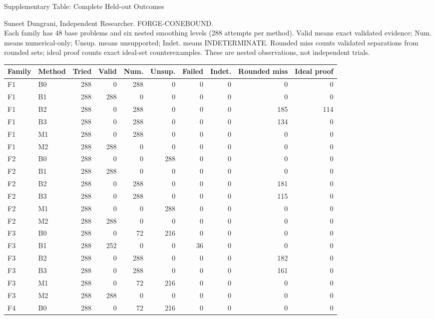 \documentclass[10pt]{article}
\begin{document}
\begin{center}\large Supplementary Table: Complete Held-out Outcomes\end{center}
\noindent Suneet Dungrani, Independent Researcher. FORGE-CONEBOUND.\\
Each family has 48 base problems and six nested smoothing levels (288 attempts per method).
Valid means exact validated evidence; Num. means numerical-only; Unsup. means unsupported;
Indet. means INDETERMINATE. Rounded miss counts validated separations from rounded sets;
ideal proof counts exact ideal-set counterexamples. These are nested observations, not independent trials.
\begin{center}\small
\begin{longtable}{llrrrrrrrr}
\toprule Family & Method & Tried & Valid & Num. & Unsup. & Failed & Indet. & Rounded miss & Ideal proof\\\midrule
F1 & B0 & 288 & 0 & 288 & 0 & 0 & 0 & 0 & 0 \\
F1 & B1 & 288 & 288 & 0 & 0 & 0 & 0 & 0 & 0 \\
F1 & B2 & 288 & 0 & 288 & 0 & 0 & 0 & 185 & 114 \\
F1 & B3 & 288 & 0 & 288 & 0 & 0 & 0 & 134 & 0 \\
F1 & M1 & 288 & 0 & 288 & 0 & 0 & 0 & 0 & 0 \\
F1 & M2 & 288 & 288 & 0 & 0 & 0 & 0 & 0 & 0 \\
F2 & B0 & 288 & 0 & 0 & 288 & 0 & 0 & 0 & 0 \\
F2 & B1 & 288 & 288 & 0 & 0 & 0 & 0 & 0 & 0 \\
F2 & B2 & 288 & 0 & 288 & 0 & 0 & 0 & 181 & 0 \\
F2 & B3 & 288 & 0 & 288 & 0 & 0 & 0 & 115 & 0 \\
F2 & M1 & 288 & 0 & 0 & 288 & 0 & 0 & 0 & 0 \\
F2 & M2 & 288 & 288 & 0 & 0 & 0 & 0 & 0 & 0 \\
F3 & B0 & 288 & 0 & 72 & 216 & 0 & 0 & 0 & 0 \\
F3 & B1 & 288 & 252 & 0 & 0 & 36 & 0 & 0 & 0 \\
F3 & B2 & 288 & 0 & 288 & 0 & 0 & 0 & 182 & 0 \\
F3 & B3 & 288 & 0 & 288 & 0 & 0 & 0 & 161 & 0 \\
F3 & M1 & 288 & 0 & 72 & 216 & 0 & 0 & 0 & 0 \\
F3 & M2 & 288 & 288 & 0 & 0 & 0 & 0 & 0 & 0 \\
F4 & B0 & 288 & 0 & 72 & 216 & 0 & 0 & 0 & 0 \\

\end{longtable}
\end{center}
\end{document}
